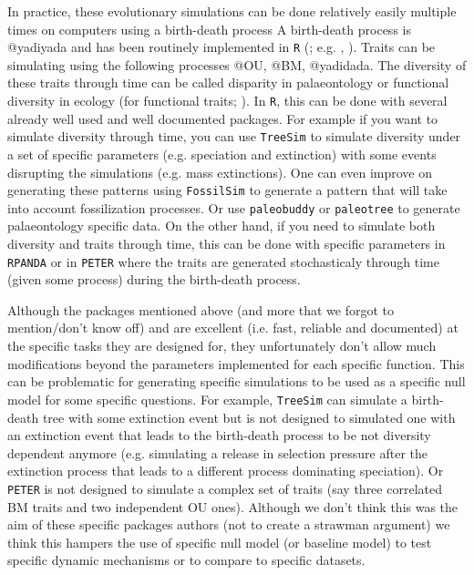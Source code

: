 \documentclass[12pt,letterpaper]{article}
\begin{document}
In practice, these evolutionary simulations can be done relatively easily multiple times on computers using a birth-death process \cite{feller1939birthdeath,stadler2010birthdeath,diversitree}
A birth-death process is @yadiyada and has been routinely implemented in \texttt{R} (\citealt{R}; e.g. \citealt{ape}, \citealt{diversitree}).
Traits can be simulating using the following processes @OU, @BM, @yadidada. %
The diversity of these traits through time can be called disparity in palaeontology \cite{guillerme2020disparities} or functional diversity in ecology (for functional traits; \citealt{mammola2021concepts}).
In \texttt{R}, this can be done with several already well used and well documented packages.
For example if you want to simulate diversity through time, you can use \texttt{TreeSim} \citep{treesim} to simulate diversity under a set of specific parameters (e.g. speciation and extinction) with some events disrupting the simulations (e.g. mass extinctions).
One can even improve on generating these patterns using \texttt{FossilSim} \citep{fossilsim} to generate a pattern that will take into account fossilization processes.
Or use \texttt{paleobuddy} \citep{paleobuddy} or \texttt{paleotree} \citep{paleotree} to generate palaeontology specific data.
On the other hand, if you need to simulate both diversity and traits through time, this can be done with specific parameters in \texttt{RPANDA} \citep{rpanda} or in \texttt{PETER} \citep{puttick2020complex} where the traits are generated stochasticaly through time (given some process) during the birth-death process.






Although the packages mentioned above (and more that we forgot to mention/don't know off) and are excellent (i.e. fast, reliable and documented) at the specific tasks they are designed for, they unfortunately don't allow much modifications beyond the parameters implemented for each specific function.
This can be problematic for generating specific simulations to be used as a specific null model for some specific questions.
For example, \texttt{TreeSim} can simulate a birth-death tree with some extinction event but is not designed to simulated one with an extinction event that leads to the birth-death process to be not diversity dependent anymore (e.g. simulating a release in selection pressure after the extinction process that leads to a different process dominating speciation).
Or \texttt{PETER} is not designed to simulate a complex set of traits (say three correlated BM traits and two independent OU ones).
Although we don't think this was the aim of these specific packages authors (not to create a strawman argument) we think this hampers the use of specific null model (or baseline model) to test specific dynamic mechanisms or to compare to specific datasets. 
\end{document}
